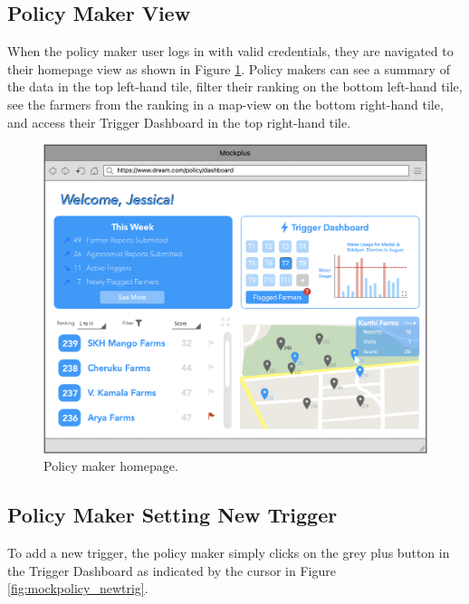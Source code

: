 \newpage
\subsection{Policy Maker View}
\noindent
When the policy maker user logs in with valid credentials, they are navigated to their homepage view as shown in Figure \ref{fig:mockpolicy_dash}. Policy makers can see a summary of the data in the top left-hand tile, filter their ranking on the bottom left-hand tile, see the farmers from the ranking in a map-view on the bottom right-hand tile, and access their Trigger Dashboard in the top right-hand tile. 

\begin{figure}[H]
\centering
\includegraphics[scale=0.35]{../images_diagrams/mock_ups/policydash100.png}
\caption{\label{fig:mockpolicy_dash}Policy maker homepage.}
\end{figure}

\subsection{Policy Maker Setting New Trigger}
\noindent
To add a new trigger, the policy maker simply clicks on the grey plus button in the Trigger Dashboard as indicated by the cursor in Figure \ref{fig:mockpolicy_newtrig}.


